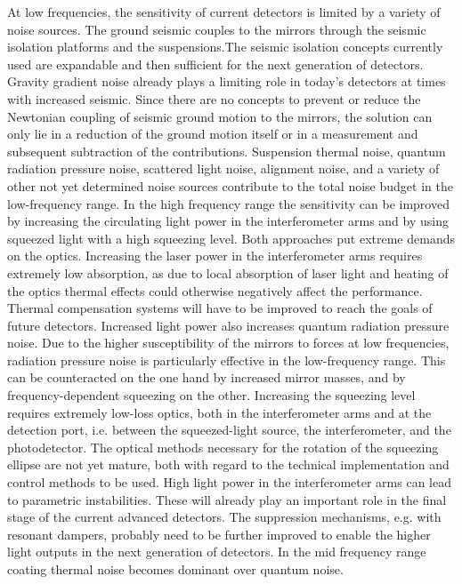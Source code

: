 At low frequencies, the sensitivity of current detectors is limited by a variety of noise sources. The ground seismic couples to the mirrors through the seismic isolation platforms and the suspensions.The seismic isolation concepts currently used are expandable and then sufficient for the next generation of detectors. Gravity gradient noise already plays a limiting role in today's detectors at times with increased seismic. Since there are no concepts to prevent or reduce the Newtonian coupling of seismic ground motion to the mirrors, the solution can only lie in a reduction of the ground motion itself or in a measurement and subsequent subtraction of the contributions. Suspension thermal noise, quantum radiation pressure noise, scattered light noise, alignment noise, and a variety of other not yet determined noise sources contribute to the total noise budget in the low-frequency range.
In the high frequency range the sensitivity can be improved by increasing the circulating light power in the interferometer arms and by using squeezed light with a high squeezing level. Both approaches put extreme demands on the optics. Increasing the laser power in the interferometer arms requires extremely low absorption, as due to local absorption of laser light and heating of the optics thermal effects could otherwise negatively affect the performance. Thermal compensation systems will have to be improved to reach the goals of future detectors. Increased light power also increases quantum radiation pressure noise. Due to the higher susceptibility of the mirrors to forces at low frequencies, radiation pressure noise is particularly effective in the low-frequency range. This can be counteracted on the one hand by increased mirror masses, and by frequency-dependent squeezing on the other. Increasing the squeezing level requires extremely low-loss optics, both in the interferometer arms and at the detection port, i.e. between the squeezed-light source, the interferometer, and the photodetector. The optical methods necessary for the rotation of the squeezing ellipse are not yet mature, both with regard to the technical implementation and control methods to be used. High light power in the interferometer arms can lead to parametric instabilities. These will already play an important role in the final stage of the current advanced detectors. The suppression mechanisms, e.g. with resonant dampers, probably need to be further improved to enable the higher light outputs in the next generation of detectors.
In the mid frequency range coating thermal noise becomes dominant over quantum noise.
